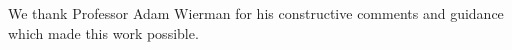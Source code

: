 We thank Professor Adam Wierman for his constructive comments and guidance which made this work possible.
